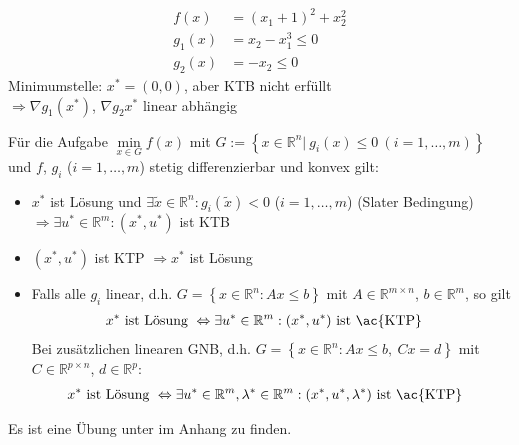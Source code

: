 \begin{gegenexmp}\hspace{1cm}\\
\begin{minipage}{0.5\textwidth}
\begin{align*}
f(x) & = (x_1+1)^2+x^2_2\\
g_1(x) & = x_2-x^3_1 \le 0\\
g_2(x) & = -x_2 \le 0
\end{align*}
Minimumstelle: $x^{\ast}=(0,0)$, aber \ac{KTB} nicht erfüllt\\
$\Rightarrow \nabla g_1(x^{\ast})$, $\nabla g_2{x^{\ast}}$ linear abhängig

\end{minipage}
\begin{minipage}{0.5\textwidth}
	\centering
	
\end{minipage}
\end{gegenexmp}

\begin{satz}\label{satz:5}
Für die Aufgabe $\min\limits_{x\in G}f(x)$ mit $G:=\left\{ x\in\mathbb{R}^n|\ g_i(x)\le 0\ (i=1,\ldots,m) \right\}$ und $f$, $g_i$ ($i=1,\ldots,m$) stetig differenzierbar und konvex
gilt:
\begin{itemize}
  \item $x^{\ast}$ ist Lösung und $\exists\tilde{x}\in\mathbb{R}^n:g_i(\tilde{x})<0$ ($i=1,\ldots,m$) (Slater Bedingung)\\
  $\Rightarrow \exists u^{\ast}\in\mathbb{R}^m:(x^{\ast},u^{\ast})$ ist \ac{KTB}
  \item $(x^{\ast},u^{\ast})$ ist \ac{KTP} $\Rightarrow x^{\ast}$ ist Lösung 
  \item Falls alle $g_i$ linear, d.h. $G=\left\{x\in\mathbb{R}^n:Ax\le b \right\}$ mit $A\in\mathbb{R}^{m\times n}$, $b\in\mathbb{R}^m$, so gilt
  \begin{align*}
  	x^{\ast}\text{ ist Lösung } &\Leftrightarrow \exists u^{\ast}\in\mathbb{R}^m:(x^{\ast},u^{\ast})\text{ ist \ac{KTP}}
  \end{align*}
  Bei zusätzlichen linearen \ac{GNB}, d.h. $G=\left\{x\in\mathbb{R}^n:Ax\le b,\ Cx=d \right\}$ mit $C\in\mathbb{R}^{p\times n}$, $d\in\mathbb{R}^p$:
  \begin{align*}
  	x^{\ast}\text{ ist Lösung } &\Leftrightarrow \exists u^{\ast}\in\mathbb{R}^m,\lambda^{\ast}\in\mathbb{R}^m:(x^{\ast},u^{\ast},\lambda^{\ast})\text{ ist \ac{KTP}}
  \end{align*}
\end{itemize}
\end{satz}
Es ist eine Übung unter  im Anhang zu finden.

